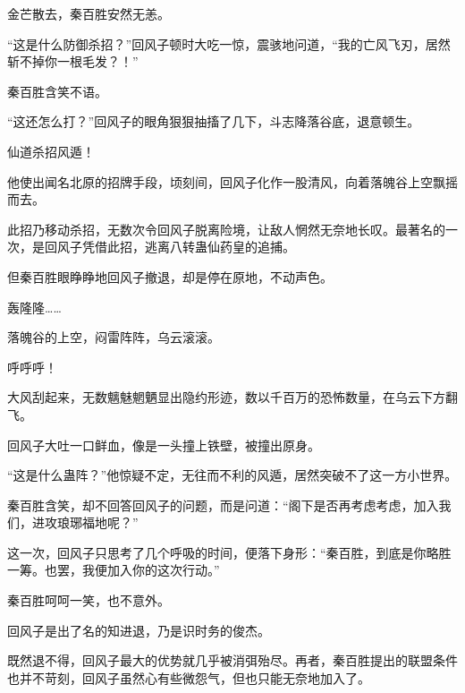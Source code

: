 \begin{this_body}
金芒散去，秦百胜安然无恙。

“这是什么防御杀招？”回风子顿时大吃一惊，震骇地问道，“我的亡风飞刃，居然斩不掉你一根毛发？！”

秦百胜含笑不语。

“这还怎么打？”回风子的眼角狠狠抽搐了几下，斗志降落谷底，退意顿生。

仙道杀招风遁！

他使出闻名北原的招牌手段，顷刻间，回风子化作一股清风，向着落魄谷上空飘摇而去。

此招乃移动杀招，无数次令回风子脱离险境，让敌人惘然无奈地长叹。最著名的一次，是回风子凭借此招，逃离八转蛊仙药皇的追捕。

但秦百胜眼睁睁地回风子撤退，却是停在原地，不动声色。

轰隆隆……

落魄谷的上空，闷雷阵阵，乌云滚滚。

呼呼呼！

大风刮起来，无数魑魅魍魉显出隐约形迹，数以千百万的恐怖数量，在乌云下方翻飞。

回风子大吐一口鲜血，像是一头撞上铁壁，被撞出原身。

“这是什么蛊阵？”他惊疑不定，无往而不利的风遁，居然突破不了这一方小世界。

秦百胜含笑，却不回答回风子的问题，而是问道：“阁下是否再考虑考虑，加入我们，进攻琅琊福地呢？”

这一次，回风子只思考了几个呼吸的时间，便落下身形：“秦百胜，到底是你略胜一筹。也罢，我便加入你的这次行动。”

秦百胜呵呵一笑，也不意外。

回风子是出了名的知进退，乃是识时务的俊杰。

既然退不得，回风子最大的优势就几乎被消弭殆尽。再者，秦百胜提出的联盟条件也并不苛刻，回风子虽然心有些微怨气，但也只能无奈地加入了。

\end{this_body}

